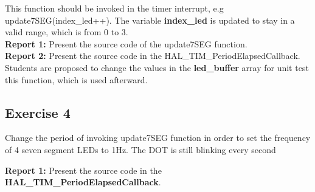 This function should be invoked in the timer interrupt, e.g update7SEG(index\_led++). The variable \textbf{index\_led} is updated to stay in a valid range, which is from 0 to 3. \\

\textbf{Report 1: } Present the source code of the update7SEG function. \\

\textbf{Report 2: } Present the source code in the HAL\_TIM\_PeriodElapsedCallback.\\

Students are proposed to change the values in the \textbf{led\_buffer} array for unit test this function, which is used afterward.

\subsection{Exercise 4}
Change the period of invoking update7SEG function in order to set the frequency of 4 seven segment LEDs to 1Hz. The DOT is still blinking every second


\textbf{Report 1: } Present the source code in the \textbf{HAL\_TIM\_PeriodElapsedCallback}. \\